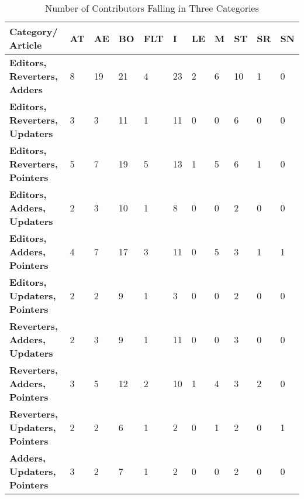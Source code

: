 \documentclass{llncs}
\begin{document}
\begin{table}[]
\centering
\begin{tabular}{T{4.9cm} T{0.6cm} T{0.6cm} T{0.6cm} T{0.6cm} T{0.6cm} T{0.6cm} T{0.6cm} T{0.6cm} T{0.6cm} T{0.6cm}}
{\bf Category/ Article} & {\bf AT} &  {\bf AE} &{\bf BO} & {\bf FLT} &  {\bf I} &  {\bf LE} &  {\bf M} &  {\bf ST} &  {\bf SR} &  {\bf SN} \\ \hline
{\bf Editors, Reverters,  Adders}                    & 8   & 19  & 21  & 4   & 23  & 2   & 6   & 10  & 1   & 0  \\ 
{\bf Editors, Reverters, Updaters}                   & 3   & 3   & 11  & 1   & 11  & 0   & 0   & 6   & 0   & 0  \\ 
{\bf Editors, Reverters, Pointers}                   & 5   & 7   & 19  & 5   & 13  & 1   & 5   & 6   & 1   & 0  \\ 
{\bf Editors, Adders, Updaters}                      & 2   & 3   & 10  & 1   & 8   & 0   & 0   & 2   & 0   & 0  \\ 
{\bf Editors, Adders, Pointers}                      & 4   & 7   & 17  & 3   & 11  & 0   & 5   & 3   & 1   & 1  \\ 
{\bf Editors, Updaters, Pointers}                    & 2   & 2   & 9   & 1   & 3   & 0   & 0   & 2   & 0   & 0  \\ 
{\bf Reverters, Adders, Updaters}                   & 2   & 3   & 9   & 1   & 11  & 0   & 0   & 3   & 0   & 0  \\ 
{\bf Reverters, Adders, Pointers}                    & 3   & 5   & 12  & 2   & 10  & 1   & 4   & 3   & 2   & 0  \\ 
{\bf Reverters, Updaters, Pointers}                  & 2   & 2   & 6   & 1   & 2   & 0   & 1   & 2   & 0   & 1  \\ 
{\bf Adders, Updaters, Pointers}                     & 3   & 2   & 7   & 1   & 2   & 0   & 0   & 2   & 0   & 0  
  
\end{tabular}
\caption{Number of Contributors Falling in Three Categories}
\label{category_three}
\end{table}
\end{document}
